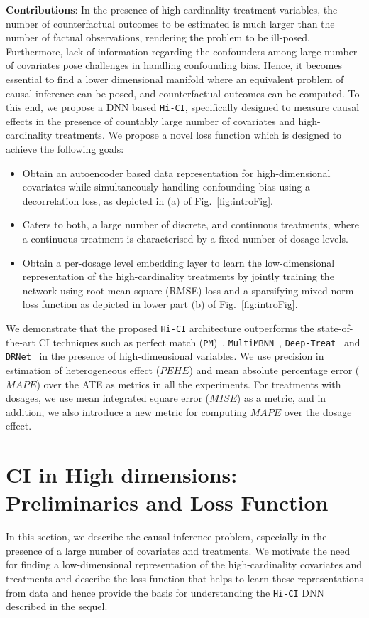 \documentclass[twoside,11pt]{article}
\begin{document}
 \textbf{Contributions}: In the presence of high-cardinality treatment variables, the number of counterfactual outcomes to be estimated is much larger than the number of factual observations, rendering the problem to be ill-posed. Furthermore, lack of information regarding the confounders among large number of covariates pose challenges in handling confounding bias. Hence, it becomes essential to find a lower dimensional manifold where an equivalent problem of causal inference can be posed, and counterfactual outcomes can be computed. To this end, we propose a DNN based \texttt{Hi-CI}, specifically designed to measure causal effects in the presence of countably large number of covariates and high-cardinality treatments. We propose a novel loss function which is designed to achieve the following goals:
 \begin{itemize}
     \item Obtain an autoencoder based data representation for high-dimensional covariates while simultaneously handling confounding bias using a decorrelation loss, as depicted in (a) of Fig.~\ref{fig:introFig}.
     \item Caters to both, a large number of discrete, and  continuous treatments, where a continuous treatment is characterised by a fixed number of dosage levels.
     \item Obtain a per-dosage level embedding layer to learn the low-dimensional representation of the high-cardinality treatments by jointly training the network using root mean square (RMSE) loss and a sparsifying mixed norm loss function as depicted in lower part (b) of Fig.~\ref{fig:introFig}.
 \end{itemize}

 We demonstrate that the proposed \texttt{Hi-CI} architecture outperforms the state-of-the-art CI techniques such as perfect match (\texttt{PM})~\citep{schwab2018perfect}, \texttt{MultiMBNN}~\citep{esann-multiMBNN}, \texttt{Deep-Treat}~\citep{atan2018deep} and \texttt{DRNet}~\citep{schwab2019learning} in the presence of high-dimensional variables. We use precision in estimation of heterogeneous effect ($PEHE$) and mean absolute percentage error ($MAPE$) over the ATE as metrics in all the experiments. For treatments with dosages, we use mean integrated square error ($MISE$) as a metric, and in addition, we also introduce a new metric for computing $MAPE$ over the dosage effect.

\section{CI in High dimensions: Preliminaries and Loss Function}
In this section, we describe the causal inference problem, especially in the presence of a large number of covariates and treatments. We motivate the need for finding a low-dimensional representation of the high-cardinality covariates and treatments and describe the loss function that helps to learn these representations from data and hence provide the basis for understanding the \texttt{Hi-CI} DNN described in the sequel.
\end{document}
